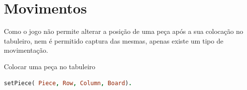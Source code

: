 \documentclass[a4paper]{article}
\begin{document}
\section{Movimentos}

Como o jogo não permite alterar a posição de uma peça após a sua colocação no tabuleiro, nem é permitido captura das mesmas, apenas existe um tipo de movimentação.\linebreak

\Large Colocar uma peça no tabuleiro 
\begin{lstlisting}[language=Prolog]
setPiece( Piece, Row, Column, Board).
\end{lstlisting}
\end{document}
